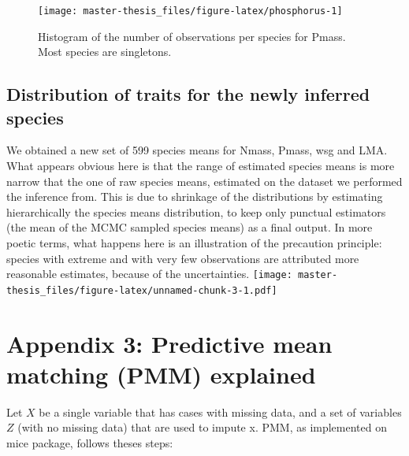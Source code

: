 \documentclass[12pt,]{article}
\let\oldsection\section
\renewcommand\section{\newpage\oldsection}
\theoremstyle{definition}
\theoremstyle{definition}
\theoremstyle{definition}
\theoremstyle{remark}
\begin{document}
\begin{figure}
\texttt{[image: master-thesis\_files/figure-latex/phosphorus-1]} \caption{Histogram of the number of observations per species for Pmass. Most species are singletons.}\label{fig:phosphorus}
\end{figure}

\subsection{Distribution of traits for the newly inferred
species}\label{distribution-of-traits-for-the-newly-inferred-species}

We obtained a new set of 599 species means for Nmass, Pmass, wsg and
LMA. What appears obvious here is that the range of estimated species
means is more narrow that the one of raw species means, estimated on the
dataset we performed the inference from. This is due to shrinkage of the
distributions by estimating hierarchically the species means
distribution, to keep only punctual estimators (the mean of the MCMC
sampled species means) as a final output. In more poetic terms, what
happens here is an illustration of the precaution principle: species
with extreme and with very few observations are attributed more
reasonable estimates, because of the uncertainties.
\texttt{[image: master-thesis\_files/figure-latex/unnamed-chunk-3-1.pdf]}

\section{Appendix 3: Predictive mean matching (PMM)
explained}\label{appendix-3-predictive-mean-matching-pmm-explained}

Let \(X\) be a single variable that has cases with missing data, and a
set of variables \(Z\) (with no missing data) that are used to impute x.
PMM, as implemented on mice package, follows theses steps:
\end{document}
